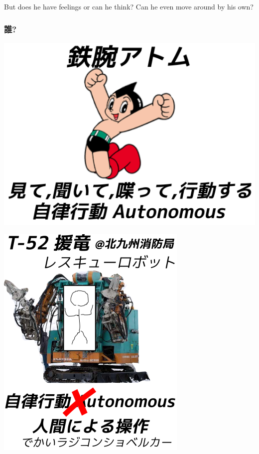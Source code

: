 \begin{resume}
But does he have feelings or can he think? Can he even move around by his own?
\end{resume}

\subsubsection{誰?}
\label{sec-1-1-5}

\begin{container-fluid}
\begin{row-fluid}
\begin{span6}
\includegraphics{img/astro/final.png}
\end{span6}
\begin{span6}
\includegraphics{img/rescue/final.png}
\end{span6}
\end{row-fluid}
\end{container-fluid}

